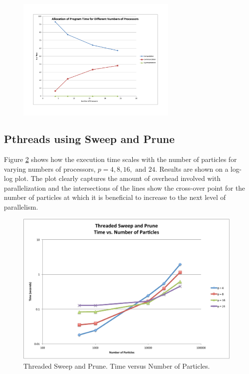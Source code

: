 \documentclass[11pt]{article} %
\begin{document}
\begin{figure}[!h]
\centering
\includegraphics*[width=0.7\textwidth, viewport= 70 70 730 550]{figures/mpips_timealloc_vs_p}
\caption{}
\label{mpips_timealloc_vs_p}
\end{figure}

\subsection{Pthreads using Sweep and Prune}
Figure \ref{plot:thread_t_v_n} shows how the execution time scales
with the number of particles for varying numbers of processors, $p=4,8,16,\text{ and }24$.
Results are shown on a log-log plot. The plot clearly captures the
amount of overhead involved with parallelization and the intersections
of the lines show the cross-over point for the number of particles
at which it is beneficial to increase to the next level of parallelism. 

\begin{figure}
\begin{centering}
\includegraphics[width=0.5\paperwidth]{figures/thread_t_v_n}
\par\end{centering}

\caption{Threaded Sweep and Prune. Time versus Number of Particles.}
\label{plot:thread_t_v_n}
\end{figure}
\end{document}
